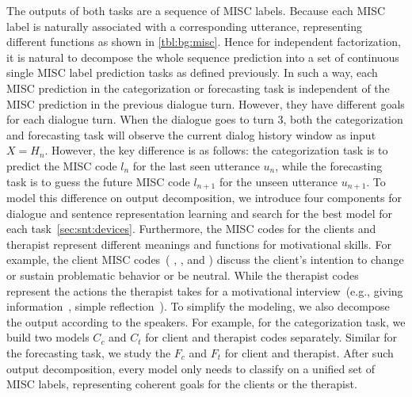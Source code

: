  The outputs of both tasks are a
sequence of MISC labels. Because each MISC label is naturally
associated with a corresponding utterance, representing different
functions as shown in \autoref{tbl:bg:misc}. Hence for independent
factorization, it is natural to decompose the whole sequence
prediction into a set of continuous single MISC label prediction tasks
as defined previously. In such a way, each MISC prediction in the
categorization or forecasting task is independent of the MISC
prediction in the previous dialogue turn. However, they have different
goals for each dialogue turn. When the dialogue goes to turn 3, both
the categorization and forecasting task will observe the current
dialog history window as input $X=H_{n}$. However, the key difference
is as follows: the categorization task is to predict the MISC code
$l_{n}$ for the last seen utterance $u_{n}$, while the forecasting
task is to guess the future MISC code $l_{n+1}$ for the unseen
utterance $u_{n+1}$. To model this difference on output decomposition,
we introduce four components for dialogue and sentence representation
learning and search for the best model for each
task~\autoref{sec:snt:devices}. Furthermore, the MISC codes for the
clients and therapist represent different meanings and functions for
motivational skills. For example, the client MISC codes~( \SUSTAIN,
\CHANGE, and \FN) discuss the client's intention to change or sustain
problematic behavior or be neutral. While the therapist codes
represent the actions the therapist takes for a motivational
interview~(e.g., giving information~\GI, simple reflection~\RES). To
simplify the modeling, we also decompose the output according to the
speakers. For example, for the categorization task, we build two
models $C_{c}$ and $C_{t}$ for client and therapist codes
separately. Similar for the forecasting task, we study the $F_{c}$ and
$F_{t}$ for client and therapist. After such output decomposition,
every model only needs to classify on a unified set of MISC labels,
representing coherent goals for the clients or the therapist.

